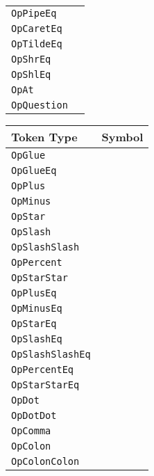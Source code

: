 \begin{table}[h]
{\begin{tabular}[t]{ll}
        \texttt{OpPipeEq} & \op{|=} \\
        \texttt{OpCaretEq} & \op{\textasciicircum=} \\
        \texttt{OpTildeEq} & \op{\textasciitilde=} \\
        \texttt{OpShrEq} & \op{\textasciitilde>=} \\
        \texttt{OpShlEq} & \op{<\textasciitilde=} \\
        \hline
        \texttt{OpAt} & \op{@} \\
        \texttt{OpQuestion} & \op{?} \\
        \hline
    \end{tabular}
}
\hfill
\parbox[t]{0.45\linewidth}{
    \centering
    \begin{tabular}[t]{ll}
        \hline
        \textbf{Token Type} & \textbf{Symbol} \\
        \hline
        \texttt{OpGlue} & \op{<>} \\
        \texttt{OpGlueEq} & \op{<>=} \\
        \hline
        \texttt{OpPlus} & \op{+} \\
        \texttt{OpMinus} & \op{-} \\
        \texttt{OpStar} & \op{*} \\
        \texttt{OpSlash} & \op{/} \\
        \texttt{OpSlashSlash} & \op{//} \\
        \texttt{OpPercent} & \op{\%} \\
        \texttt{OpStarStar} & \op{**} \\
        \hline
        \texttt{OpPlusEq} & \op{+=} \\
        \texttt{OpMinusEq} & \op{-=} \\
        \texttt{OpStarEq} & \op{*=} \\
        \texttt{OpSlashEq} & \op{/=} \\
        \texttt{OpSlashSlashEq} & \op{//=} \\
        \texttt{OpPercentEq} & \op{\%=} \\
        \texttt{OpStarStarEq} & \op{**=} \\
        \hline
        \texttt{OpDot} & \op{.} \\
        \texttt{OpDotDot} & \op{..} \\
        \texttt{OpComma} & \op{,} \\
        \texttt{OpColon} & \op{:} \\
        \texttt{OpColonColon} & \op{::} \\

\end{tabular}}
\end{table}

